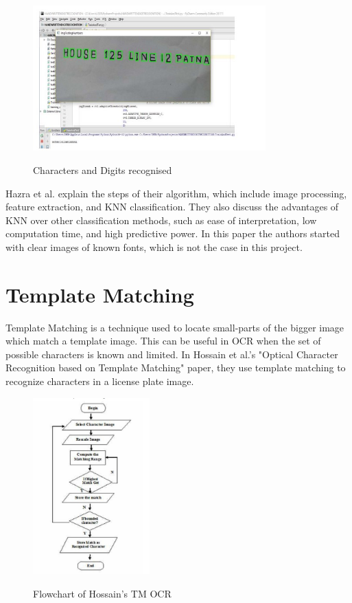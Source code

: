 \begin{figure}[!h]
    \centering
    \includegraphics[width=0.8\textwidth]{Figures/KNN_Hazra.jpg}
    \caption[Optical Character Recognition using KNN on Custom
        Image Dataset]{Characters and Digits recognised}\cite{joshuaDevelopmentImageProcessing2023}
    \label{fig:Hazra OCR KNN Paper}
\end{figure}

Hazra et al. explain the steps of their algorithm, which include image processing, feature extraction, and KNN classification. They also discuss the advantages of KNN over other classification methods, such as ease of interpretation, low computation time, and high predictive power. In this paper the authors started with clear images of known fonts, which is not the case in this project.


\newpage

\section{Template Matching}

Template Matching is a technique used to locate small-parts of the bigger image which match a template image. This can be useful in OCR when the set of possible characters is known and limited. In Hossain et al.'s "Optical Character Recognition based on Template Matching" paper, they use template matching to recognize characters in a license plate image.

\begin{figure}[ht]
    \centering
    \includegraphics[width=0.4\textwidth]{Figures/TM_Hossain.jpg}
    \caption[Flowchart of Template Matching OCR]{Flowchart of Hossain's TM OCR}\cite{hossainOpticalCharacterRecognition2019}
    \label{fig:Hossain OCR Template Matching Paper}
\end{figure}

